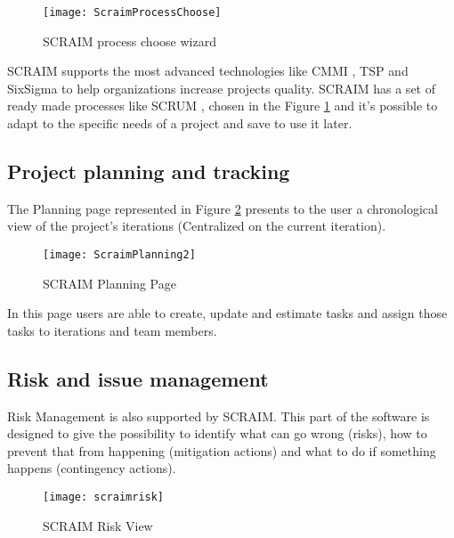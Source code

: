 \begin{figure}[h]
	\begin{center}
		\leavevmode
		\texttt{[image: ScraimProcessChoose]}
		\caption{SCRAIM process choose wizard}
		\label{fig:scraimprocesschoose}
	\end{center}
\end{figure}

SCRAIM supports the most advanced technologies like CMMI \citep{Development2010}, TSP \citep{humphrey2000team} and SixSigma \citep{SixSigmaWeb} to help organizations increase projects quality.
SCRAIM has a set of ready made processes like SCRUM \citep{Pries2011}, chosen in the Figure \ref{fig:scraimprocesschoose} and it's possible to adapt to the specific needs of a project and save to use it later.

\subsection{Project planning and tracking}

The Planning page represented in Figure \ref{fig:scraimplanning} presents to the user a chronological view of the project's iterations (Centralized on the current iteration).

\begin{figure}[h]
	\begin{center}
		\leavevmode
		\texttt{[image: ScraimPlanning2]}
		\caption{SCRAIM Planning Page}
		\label{fig:scraimplanning}
	\end{center}
\end{figure}

In this page users are able to create, update and estimate tasks and assign those tasks to iterations and team members.


\subsection{Risk and issue management}

Risk Management is also supported by SCRAIM. This part of the software is designed to give the possibility to identify what can go wrong (risks), how to prevent that from happening (mitigation actions) and what to do if something happens (contingency actions).

\begin{figure}[h]
	\begin{center}
		\leavevmode
		\texttt{[image: scraimrisk]}
		\caption{SCRAIM Risk View}
		\label{fig:scraimrisk}
	\end{center}
\end{figure}

